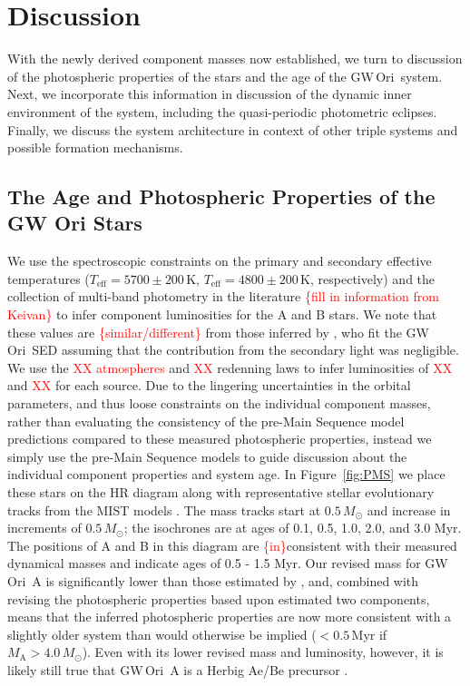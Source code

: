 \documentclass[twocolumn]{aastex61}
\newcommand{\todo}[1]{ \textcolor{red}{#1}}
\newcommand{\obj}{GW\,Ori}
\begin{document}
\section{Discussion} \label{sec:discussion}
With the newly derived component masses now established, we turn to discussion of the photospheric properties of the stars and the age of the \obj\ system. Next, we incorporate this information in discussion of the dynamic inner environment of the system, including the quasi-periodic photometric eclipses. Finally, we discuss the system architecture in context of other triple systems and possible formation mechanisms.

\subsection{The Age and Photospheric Properties of the GW Ori Stars}
We use the spectroscopic constraints on the primary and secondary effective temperatures ($T_\mathrm{eff} = 5700 \pm 200\,\mathrm{K}$, $T_\mathrm{eff} = 4800 \pm 200\,\mathrm{K}$, respectively) and the collection of multi-band photometry in the literature \todo{\{fill in information from Keivan\}} to infer component luminosities for the A and B stars. We note that these values are \todo{\{similar/different\}} from those inferred by \citet{fang14}, who fit the \obj\ SED assuming that the contribution from the secondary light was negligible. We use the \todo{XX atmospheres} and \todo{XX} redenning laws to infer luminosities of \todo{XX} and \todo{XX} for each source.
Due to the lingering uncertainties in the orbital parameters, and thus loose constraints on the individual component masses, rather than evaluating the consistency of the pre-Main Sequence model predictions compared to these measured photospheric properties, instead we simply use the pre-Main Sequence models to guide discussion about the individual component properties and system age. In Figure~\ref{fig:PMS} we place these stars on the HR diagram along with representative stellar evolutionary tracks from the MIST models \citep{choi16}. The mass tracks start at $0.5\,M_\odot$ and increase in increments of $0.5\,M_\odot$; the isochrones are at ages of 0.1, 0.5, 1.0, 2.0, and 3.0 Myr. The positions of A and B in this diagram are \todo{\{in\}}consistent with their measured dynamical masses and indicate ages of 0.5 - 1.5 Myr. Our revised mass for \obj~A is significantly lower than those estimated by \citet{berger11,fang14}, and, combined with revising the photospheric properties based upon estimated two components, means that the inferred photospheric properties are now more consistent with a slightly older system than would otherwise be implied ($< 0.5$\,Myr if $M_\mathrm{A} > 4.0 \,M_\odot$). Even with its lower revised mass and luminosity, however, it is likely still true that \obj~A is a Herbig Ae/Be precursor \citep[as noted by][]{fang14}.
\end{document}
